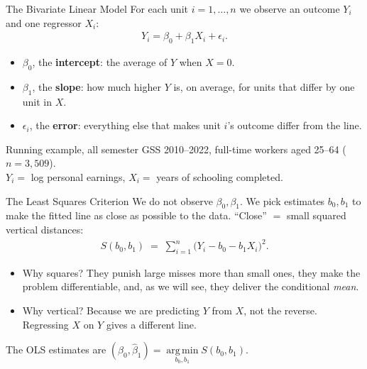 \documentclass[aspectratio=169,11pt,xcolor=dvipsnames]{beamer}
\DeclareMathOperator*{\argminop}{arg\,min}
\newcommand{\argmin}{\argminop\limits}
\begin{document}
\begin{frame}{The Bivariate Linear Model}
For each unit $i = 1,\dots,n$ we observe an outcome $Y_i$ and one regressor $X_i$:
\begin{align*}
  Y_i = \beta_0 + \beta_1 X_i + \epsilon_i .
\end{align*}
\begin{itemize}\itemsep4pt
  \item $\beta_0$, the \textbf{intercept}: the average of $Y$ when $X = 0$.
  \item $\beta_1$, the \textbf{slope}: how much higher $Y$ is, on average, for
        units that differ by one unit in $X$.
  \item $\epsilon_i$, the \textbf{error}: everything else that makes unit $i$'s
        outcome differ from the line.
\end{itemize}
\vskip6pt
\begin{block}{Running example, all semester}
GSS 2010--2022, full-time workers aged 25--64 ($n = 3{,}509$). \\
$Y_i = $ log personal earnings, $X_i = $ years of schooling completed.
\end{block}
\end{frame}

\begin{frame}{The Least Squares Criterion}
We do not observe $\beta_0,\beta_1$. We pick estimates $b_0, b_1$ to make the
fitted line as close as possible to the data. ``Close'' $=$ small squared
vertical distances:
\begin{align*}
  S(b_0, b_1) \;=\; \sum_{i=1}^{n}\big(Y_i - b_0 - b_1 X_i\big)^2 .
\end{align*}
\pause
\begin{itemize}\itemsep4pt
  \item Why squares? They punish large misses more than small ones, they make the
        problem differentiable, and, as we will see, they deliver the
        conditional \emph{mean}.
  \item Why vertical? Because we are predicting $Y$ from $X$, not the reverse.
        Regressing $X$ on $Y$ gives a different line.
\end{itemize}
\vskip4pt
The OLS estimates are $(\hat\beta_0, \hat\beta_1) = \argmin_{b_0,b_1} S(b_0,b_1)$.
\end{frame}
\end{document}
